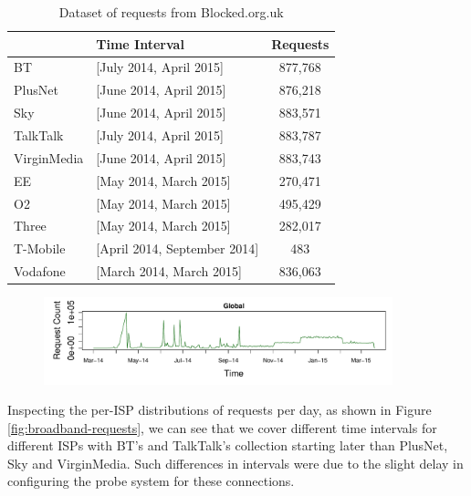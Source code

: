 \documentclass{bmcart}
\begin{document}
\begin{table}[h!]
\caption{Dataset of requests from Blocked.org.uk}
  \begin{tabular}{ l l c}
    \hline
     & Time Interval & Requests \\
    \hline
	BT & [July 2014, April 2015] & 877,768 \\
	PlusNet & [June 2014, April 2015]  & 876,218 \\
    Sky & [June 2014, April 2015] & 883,571 \\
    TalkTalk & [July 2014, April 2015] & 883,787 \\
	VirginMedia & [June 2014, April 2015] & 883,743 \\
	\hline    
	EE & [May 2014, March 2015] & 270,471 \\
	O2 & [May 2014, March 2015] & 495,429 \\
	Three & [May 2014, March 2015] & 282,017 \\
	T-Mobile & [April 2014, September 2014] & 483 \\
	Vodafone & [March 2014, March 2015] & 836,063 \\
    \hline
  \end{tabular}
  \label{tab:dataset_summary}
\end{table}

\begin{figure}[t]
\caption{}
\includegraphics[width=0.9\textwidth]{imgs/ts-global-requests.pdf}
\label{fig:total-requests}
\end{figure}

Inspecting the per-ISP distributions of requests per day, as shown in Figure \ref{fig:broadband-requests}, we can see that we cover different time intervals for different ISPs with BT's and TalkTalk's collection starting later than PlusNet, Sky and VirginMedia.
Such differences in intervals were due to the slight delay in configuring the probe system for these connections. 
\end{document}
